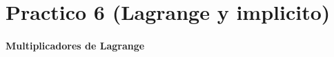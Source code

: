 \documentclass[11pt]{book}
\theoremstyle{definicion}
\theoremstyle{teorema}
\theoremstyle{ejemplo}
\newtheorem{example}{Ejemplo}
\begin{document}

    

\newpage

\section{Practico 6 (Lagrange y implicito)}

\paragraph{Multiplicadores de Lagrange}
\end{document}
